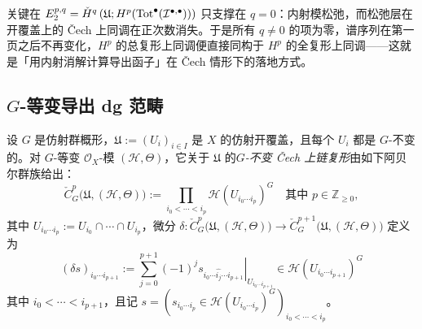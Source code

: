\begin{yizhu}[谱序列为什么退化为同构]
关键在 $E_2^{p,q}=\check{H}^q\left(\mathfrak{U};H^p(\operatorname{Tot}^{\bullet}(\mathcal{I}^{\bullet,\bullet}))\right)$ 只支撑在 $q=0$：内射模松弛，而松弛层在开覆盖上的 Čech 上同调在正次数消失。于是所有 $q\neq0$ 的项为零，谱序列在第一页之后不再变化，$H^p$ 的总复形上同调便直接同构于 $H^p$ 的全复形上同调——这就是「用内射消解计算导出函子」在 Čech 情形下的落地方式。
\end{yizhu}

\subsection[等变 dg 范畴]{$G$-等变导出 dg 范畴}

设 $G$ 是仿射群概形，$\mathfrak U:=(U_i)_{i\in I}$ 是 $X$ 的仿射开覆盖，且每个 $U_i$ 都是 $G$-不变的。对 $G$-等变 $\mathcal O_X$-模 $(\mathcal H,\Theta)$，它关于 $\mathfrak U$ 的\emph{$G$-不变 Čech 上链复形}由如下阿贝尔群族给出：
$$
\check C_G^p\big(\mathfrak U,(\mathcal H,\Theta)\big)
:=
\prod_{i_0<\cdots<i_p}
\mathcal H(U_{i_0\cdots i_p})^G
\quad\text{其中 }p\in\mathbb{Z}_{\ge0},
$$
其中 $U_{i_0\cdots i_p}:= U_{i_0}\cap\cdots\cap U_{i_p}$，微分
$
\delta:
\check{C}_G^p\big(\mathfrak{U},(\mathcal{H},\Theta)\big)
\rightarrow
\check{C}_G^{p+1}\big(\mathfrak{U},(\mathcal{H},\Theta)\big)
$
定义为
$$
(\delta s)_{i_0\cdots i_{p+1}}
:=
\sum_{j=0}^{p+1}(-1)^j
\left.
s_{i_0\cdots\widehat{i_j}\cdots i_{p+1}}
\right|_{U_{i_0\cdots i_{p+1}}}
\in
\mathcal{H}(U_{i_0\cdots i_{p+1}})^G
$$
其中 $i_0<\cdots<i_{p+1}$，且记
$
s=\left(s_{i_0\cdots i_p}\in\mathcal{H}(U_{i_0\cdots i_p})^G\right)_{i_0<\cdots<i_p}$。
